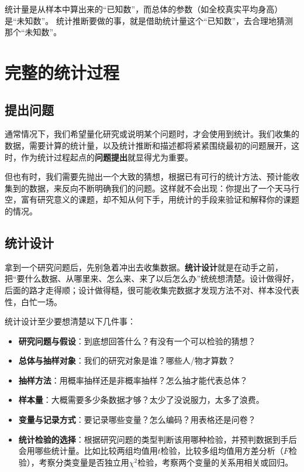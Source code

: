 \documentclass[lang=cn,10pt]{elegantbook}
\begin{document}
\begin{remark}
  统计量是从样本中算出来的“已知数”，而总体的参数（如全校真实平均身高）是“未知数”。
  统计推断要做的事，就是借助统计量这个“已知数”，去合理地猜测那个“未知数”。
\end{remark}






\chapter{完整的统计过程}
\section{提出问题}
通常情况下，我们希望量化研究或说明某个问题时，才会使用到统计。我们收集的数据，需要计算的统计量，以及统计推断和描述都将紧紧围绕最初的问题展开，这时，作为统计过程起点的\textbf{问题提出}就显得尤为重要。

但也有时，我们需要先抛出一个大致的猜想，根据已有可行的统计方法、预计能收集到的数据，来反向不断明确我们的问题。这样就不会出现：你提出了一个天马行空，富有研究意义的课题，却不知从何下手，用统计的手段来验证和解释你的课题的情况。


\section{统计设计}
拿到一个研究问题后，先别急着冲出去收集数据。\textbf{统计设计}就是在动手之前，把“要什么数据、从哪里来、怎么来、来了以后怎么办”统统想清楚。设计做得好，后面的路才走得顺；设计做得糙，很可能收集完数据才发现方法不对、样本没代表性，白忙一场。

统计设计至少要想清楚以下几件事：
\begin{itemize}
  \item \textbf{研究问题与假设}：到底想回答什么？有没有一个可以检验的猜想？
  \item \textbf{总体与抽样对象}：我们的研究对象是谁？哪些人/物才算数？
  \item \textbf{抽样方法}：用概率抽样还是非概率抽样？怎么抽才能代表总体？
  \item \textbf{样本量}：大概需要多少条数据才够？太少了没说服力，太多了浪费。
  \item \textbf{变量与记录方式}：要记录哪些变量？怎么编码？用表格还是问卷？
  \item \textbf{统计检验的选择}：根据研究问题的类型判断该用哪种检验，并预判数据到手后会用哪些统计量。比如比较两组均值用$t$检验，比较多组均值用方差分析（$F$检验），考察分类变量是否独立用$\chi^2$检验，考察两个变量的关系用相关或回归。
\end{itemize}
\end{document}
